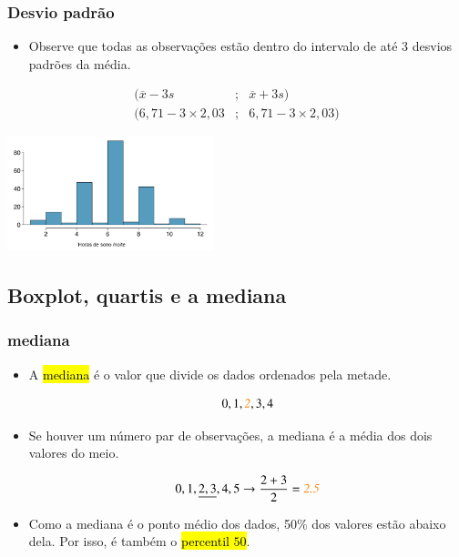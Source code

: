 \begin{frame}
\frametitle{Desvio padrão}

\begin{itemize}
\justifying
$$
 s = \sqrt{4.11} = 2.03~horas
$$
\justifying
\item Observe que todas as observações estão dentro do intervalo de até 3 desvios padrões da média.
\end{itemize}
\begin{eqnarray*}
    (\overline{x}- 3s  &;& \overline{x}+ 3s)\\
     (6,71 -3\times2,03 &;& 6,71 -3\times2,03)
\end{eqnarray*}

\includegraphics[width=6cm]{1-6_numerical_data/sleep_hist.png}

\end{frame}


\subsection{Boxplot, quartis e a mediana}


\begin{frame}
\frametitle{mediana}

\begin{itemize}
\justifying
\item A \hl{mediana} é o valor que divide  os dados ordenados pela metade.

\[ 0,1,\textit{\textcolor{orange}{2}},3,4 \]
\justifying
\item Se houver um número par de observações, a mediana é a média dos dois valores do meio.

\[ 0,1,\underline{2,3},4,5 \rightarrow \frac{2 + 3}{2} = \textit{\textcolor{orange}{2.5}} \]
\justifying
\item Como a mediana é o ponto médio dos dados, 50\% dos valores estão abaixo dela. Por isso, é também o \hl{percentil $50$}.

\end{itemize}

\end{frame}

